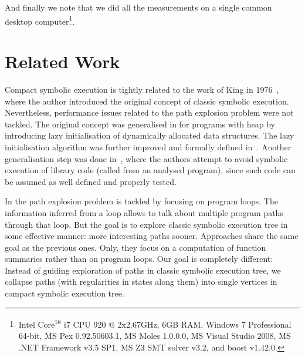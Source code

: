 \documentclass{sig-alternate}%
\newcommand{\Pex}{\textsc{Pex}\xspace}
\begin{document}
And finally we note that we did all the measurements on a single
common desktop
computer\footnote{Intel\textsuperscript{\textregistered}
Core$^{\mathtt{TM}}$ i7 CPU 920 @ 2x2.67GHz, 6GB RAM, Windows 7
Professional 64-bit, MS Pex 0.92.50603.1, MS Moles 1.0.0.0, MS Visual
Studio 2008, MS .NET Framework v3.5 SP1, MS Z3 SMT solver v3.2, and
boost v1.42.0.}.





\section{Related Work}\label{sec:related}

Compact symbolic execution is tightly related to the work of King in
1976~\cite{Kin76}, where the author introduced the original concept of
classic symbolic execution. Nevertheless, performance issues related to the
path explosion problem were not tackled. The original concept was
generalised in \cite{KPV03} for programs with heap by introducing lazy
initialisation of dynamically allocated data structures.  The lazy
initialisation algorithm was further improved and formally defined
in~\cite{DLR11}. Another generalisation step was done in~\cite{KS05}, where
the authors attempt to avoid symbolic execution of library code (called from
an analysed program), since such code can be assumed as well defined and
properly tested.

In \cite{SPmCS09,GL11} the path explosion problem is tackled by focusing on
program loops. The information inferred from a loop allows to talk about
multiple program paths through that loop. But the goal is to explore classic
symbolic execution tree in some effective manner: more interesting paths
sooner. Approaches \cite{G07,AGT08} share the same goal as the previous
ones. Only, they focus on a computation of function summaries rather than on
program loops. Our goal is completely different: Instead of guiding
exploration of paths in classic symbolic execution tree, we collapse paths
(with regularities in states along them) into single vertices in compact
symbolic execution tree.
\end{document}
